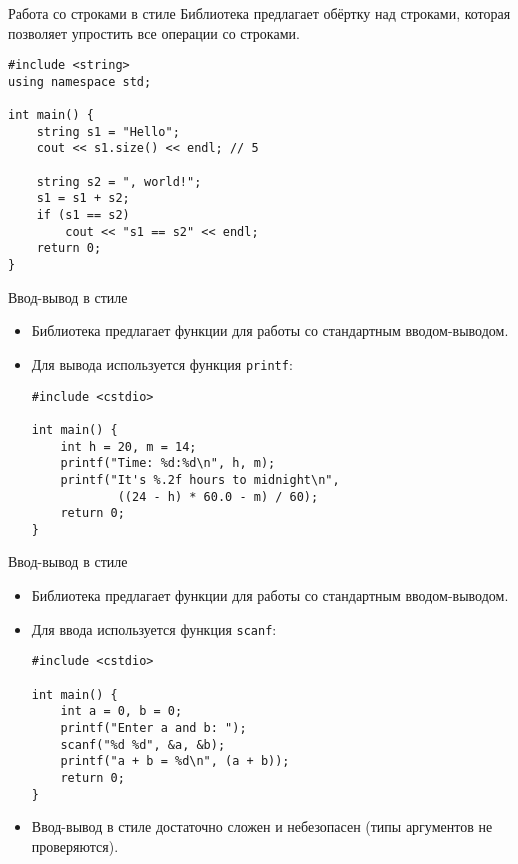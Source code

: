 \documentclass{beamer}
\begin{document}
\begin{frame}[fragile]{Работа со строками в стиле \langcpp}
        Библиотека  предлагает обёртку
            над строками, которая позволяет упростить все
            операции со строками.

\small
\begin{lstlisting}
#include <string>
using namespace std;

int main() {
    string s1 = "Hello";
    cout << s1.size() << endl; // 5

    string s2 = ", world!";
    s1 = s1 + s2;
    if (s1 == s2)
        cout << "s1 == s2" << endl;
    return 0;
}
\end{lstlisting}
\end{frame}

\begin{frame}[fragile]{Ввод-вывод в стиле \langc}
    \begin{itemize}
        \item Библиотека  предлагает функции
            для работы со стандартным вводом-выводом.

        \item Для вывода используется функция {\tt printf}:
\begin{lstlisting}
#include <cstdio>

int main() {
    int h = 20, m = 14;
    printf("Time: %d:%d\n", h, m);
    printf("It's %.2f hours to midnight\n", 
            ((24 - h) * 60.0 - m) / 60);
    return 0;
}
\end{lstlisting}
    \end{itemize}
\end{frame}

\begin{frame}[fragile]{Ввод-вывод в стиле \langc}
    \begin{itemize}
        \item Библиотека  предлагает функции
            для работы со стандартным вводом-выводом.

        \item Для ввода используется функция {\tt scanf}:
\begin{lstlisting}
#include <cstdio>

int main() {
    int a = 0, b = 0;
    printf("Enter a and b: ");
    scanf("%d %d", &a, &b);
    printf("a + b = %d\n", (a + b));
    return 0;
}
\end{lstlisting}
    \item Ввод-вывод в стиле \langc{} достаточно сложен и
        небезопасен (типы аргументов не проверяются).
    \end{itemize}
\end{frame}
\end{document}
